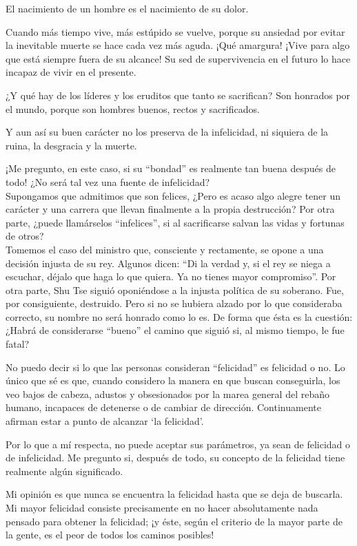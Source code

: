 \documentclass[hidelinks]{memoir}
\begin{document}
	El nacimiento de un hombre es el nacimiento de su dolor.
	
	Cuando más tiempo vive, más estúpido se vuelve, porque su ansiedad por
	evitar la inevitable muerte se hace cada vez más aguda. ¡Qué amargura!
	¡Vive para algo que está siempre fuera de su alcance! Su sed de
	supervivencia en el futuro lo hace incapaz de vivir en el presente.
	
	¿Y qué hay de los líderes y los eruditos que tanto se sacrifican? Son
	honrados por el mundo, porque son hombres buenos, rectos y sacrificados.
	
	Y aun así su buen carácter no los preserva de la infelicidad, ni
	siquiera de la ruina, la desgracia y la muerte.
	
	¡Me pregunto, en este caso, si su ``bondad'' es realmente tan buena
	después de todo! ¿No será tal vez una fuente de infelicidad?\\
	Supongamos que admitimos que son felices, ¿Pero es acaso algo alegre
	tener un carácter y una carrera que llevan finalmente a la propia
	destrucción? Por otra parte, ¿puede llamárselos ``infelices'', si al
	sacrificarse salvan las vidas y fortunas de otros?\\
	Tomemos el caso del ministro que, consciente y rectamente, se opone a
	una decisión injusta de su rey. Algunos dicen: ``Di la verdad y, si el
	rey se niega a escuchar, déjalo que haga lo que quiera. Ya no tienes
	mayor compromiso''. Por otra parte, Shu Tse siguió oponiéndose a la
	injusta política de su soberano. Fue, por consiguiente, destruido. Pero
	si no se hubiera alzado por lo que consideraba correcto, su nombre no
	será honrado como lo es. De forma que ésta es la cuestión: ¿Habrá de
	considerarse ``bueno'' el camino que siguió si, al mismo tiempo, le fue
	fatal?
	
	No puedo decir si lo que las personas consideran ``felicidad'' es
	felicidad o no. Lo único que sé es que, cuando considero la manera en
	que buscan conseguirla, los veo bajos de cabeza, adustos y obsesionados
	por la marea general del rebaño humano, incapaces de detenerse o de
	cambiar de dirección. Continuamente afirman estar a punto de alcanzar
	`la felicidad'.
	
	Por lo que a mí respecta, no puede aceptar sus parámetros, ya sean de
	felicidad o de infelicidad. Me pregunto si, después de todo, su concepto
	de la felicidad tiene realmente algún significado.
	
	Mi opinión es que nunca se encuentra la felicidad hasta que se deja de
	buscarla. Mi mayor felicidad consiste precisamente en no hacer
	absolutamente nada pensado para obtener la felicidad; ¡y éste, según el
	criterio de la mayor parte de la gente, es el peor de todos los caminos
	posibles!
	
\end{document}

